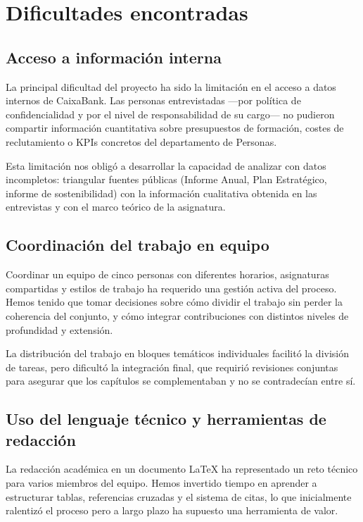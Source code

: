 \section{Dificultades encontradas}

\subsection{Acceso a información interna}

La principal dificultad del proyecto ha sido la limitación en el acceso a
datos internos de CaixaBank. Las personas entrevistadas —por política de
confidencialidad y por el nivel de responsabilidad de su cargo— no pudieron
compartir información cuantitativa sobre presupuestos de formación, costes
de reclutamiento o KPIs concretos del departamento de Personas.

Esta limitación nos obligó a desarrollar la capacidad de analizar con datos
incompletos: triangular fuentes públicas (Informe Anual, Plan Estratégico,
informe de sostenibilidad) con la información cualitativa obtenida en las
entrevistas y con el marco teórico de la asignatura.

\subsection{Coordinación del trabajo en equipo}

Coordinar un equipo de cinco personas con diferentes horarios, asignaturas
compartidas y estilos de trabajo ha requerido una gestión activa del proceso.
Hemos tenido que tomar decisiones sobre cómo dividir el trabajo sin perder
la coherencia del conjunto, y cómo integrar contribuciones con distintos
niveles de profundidad y extensión.

La distribución del trabajo en bloques temáticos individuales facilitó la
división de tareas, pero dificultó la integración final, que requirió
revisiones conjuntas para asegurar que los capítulos se complementaban
y no se contradecían entre sí.

\subsection{Uso del lenguaje técnico y herramientas de redacción}

La redacción académica en un documento LaTeX ha representado un reto técnico
para varios miembros del equipo. Hemos invertido tiempo en aprender a
estructurar tablas, referencias cruzadas y el sistema de citas, lo que inicialmente
ralentizó el proceso pero a largo plazo ha supuesto una herramienta de valor.

